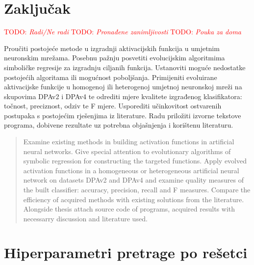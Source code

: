 \documentclass[times, utf8, numeric, diplomski]{fer}
\def\TODO#1{\noindent\textcolor{red}{TODO: \textit{#1}}\newline}
\def\todo#1{\TODO{#1}}
\begin{document}
\chapter{Zaključak}
\todo{Radi/Ne radi}
\todo{Pronađene zanimljivosti}
\todo{Pouka za doma}




\begin{sazetak}
Proučiti postojeće metode u izgradnji aktivacijskih funkcija u umjetnim neuronskim mrežama. Posebnu pažnju posvetiti evolucijskim algoritmima simboličke regresije za izgradnju ciljanih funkcija. Ustanoviti moguće nedostatke postojećih algoritama ili mogućnost poboljšanja. Primijeniti evoluirane aktivacijske funkcije u homogenoj ili heterogenoj umjetnoj neuronskoj mreži na skupovima DPAv2 i DPAv4 te odrediti mjere kvalitete izgrađenog klasifikatora: točnost, preciznost, odziv te F mjere. Usporediti učinkovitost ostvarenih postupaka s postojećim rješenjima iz literature. Radu priložiti izvorne tekstove programa, dobivene rezultate uz potrebna objašnjenja i korištenu literaturu.

\end{sazetak}

\begin{abstract}
Examine existing methods in building activation functions in artificial neural networks. Give special attention to evolutionary algorithms of symbolic regression for constructing the targeted functions. Apply evolved activation functions in a homogeneous or heterogeneous artificial neural network on datasets DPAv2 and DPAv4 and examine quality measures of the built classifier: accuracy, precision, recall and F measures. Compare the efficiency of acquired methods with existing solutions from the literature. Alongside thesis attach source code of programs, acquired results with necessarry discussion and literature used.

\end{abstract}

\appendix
\chapter{Hiperparametri pretrage po rešetci}
\label{app:grid_hp}
\end{document}
